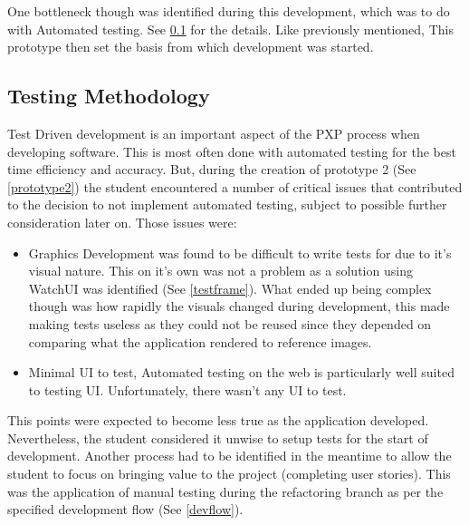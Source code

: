 One bottleneck though was identified during this development, which was to do with Automated testing. See \ref{automatedtests} for the details.
Like previously mentioned, This prototype then set the basis from which development was started.

\subsection{Testing Methodology} \label{automatedtests}
Test Driven development is an important aspect of the PXP process when developing software. This is most often done with automated testing for the best time efficiency and accuracy. But, during the creation of prototype 2 (See \ref{prototype2}) the student encountered a number of critical issues that contributed to the decision to not implement automated testing, subject to possible further consideration later on. Those issues were:

\begin{itemize}
    \item Graphics Development was found to be difficult to write tests for due to it's visual nature. This on it's own was not a problem as a solution using WatchUI was identified (See \ref{testframe}). What ended up being complex though was how rapidly the visuals changed during development, this made making tests useless as they could not be reused since they depended on comparing what the application rendered to reference images.
    \item Minimal UI to test, Automated testing on the web is particularly well suited to testing UI. Unfortunately, there wasn't any UI to test.
\end{itemize}

This points were expected to become less true as the application developed. Nevertheless, the student considered it unwise to setup tests for the start of development. Another process had to be identified in the meantime to allow the student to focus on bringing value to the project (completing user stories). This was the application of manual testing during the refactoring branch as per the specified development flow (See \ref{devflow}).


